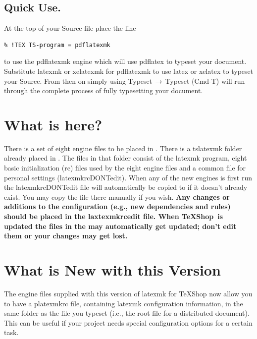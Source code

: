 \documentclass[11pt]{article}
\newcommand{\mnu}[1]{\textsf{#1}}
\newcommand{\cmd}[1]{\textsf{#1}}
\newcommand{\To}{\,\(\to\)\,}
\newcommand{\TS}{\textsf{\TeX Shop}}
\begin{document}
\subsection{Quick Use.}

At the top of your Source file place the line
\begin{verbatim}
% !TEX TS-program = pdflatexmk
\end{verbatim}
to use the \cmd{pdflatexmk} engine which will use \cmd{pdflatex} to typeset your document. Substitute \cmd{latexmk} or \cmd{xelatexmk} for \cmd{pdflatexmk} to use \cmd{latex} or \cmd{xelatex} to typeset your Source. From then on simply using \mnu{Typeset}\To\mnu{Typeset} (\cmd{Cmd-T}) will run through the complete process of fully typesetting your document.

\section{What is here?}

There is a set of eight \cmd{engine} files to be placed in . There is a \cmd{tslatexmk} folder already placed in . The files in that folder consist of the \cmd{latexmk} program, eight basic initialization (\cmd{rc}) files used by the eight \cmd{engine} files and a common file for personal settings (\cmd{latexmkrcDONTedit}). When any of the new engines is first run the \cmd{latexmkrcDONTedit} file will automatically be copied to  if it doesn't already exist. You may copy the file there manually if you wish. \textbf{Any changes or additions to the configuration (e.g., new dependencies and rules) should be placed in the \cmd{laxtexmkrcedit} file. When \TS\ is updated the files in the  may automatically get updated; don't edit them or your changes may get lost.}

\section{What is New with this Version}

The engine files supplied with this version of latexmk for TeXShop now allow you to have a \cmd{platexmkrc} file, containing \cmd{latexmk} configuration information, in the same folder as the file you typeset (i.e., the root file for a distributed document). This can be useful if your project needs special configuration options for a certain task.
\end{document}
